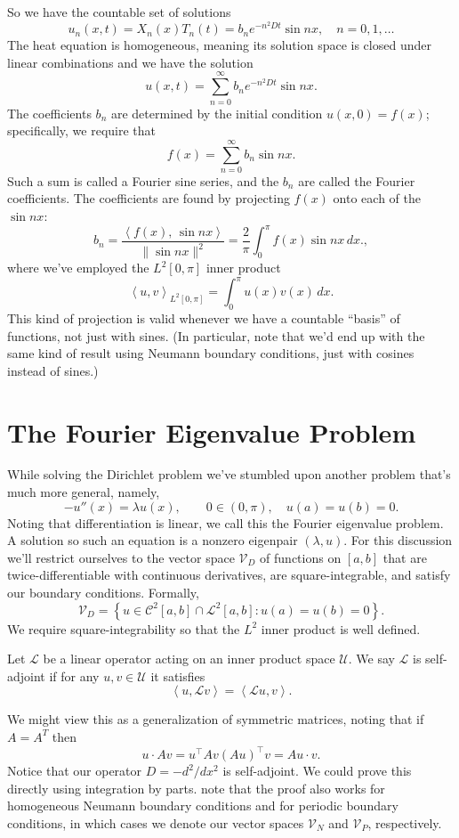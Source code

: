 \documentclass[../m180main.tex]{subfiles}
\begin{document}
So we have the countable set of solutions
\[ u_n(x,t) = X_n(x) T_n(t) = b_n e^{-n^2 Dt} \sin nx, \quad n = 0, 1, \ldots \]
The heat equation is homogeneous, meaning its solution space is closed under linear combinations and we have the solution
\[ u(x,t) = \sum_{n=0}^{\infty} b_n e^{-n^2 Dt} \sin nx. \] %
The coefficients $b_n$ are determined by the initial condition $u(x,0) = f(x)$; specifically, we require that
\[ f(x) = \sum_{n=0}^{\infty} b_n \sin nx. \]
Such a sum is called a Fourier sine series, and the $b_n$ are called the Fourier coefficients.
The coefficients are found by projecting $f(x)$ onto each of the $\sin nx$:
\[ b_n = \frac{\left< f(x), \, \sin nx \right>}{\| \sin nx \|^2} = \frac{2}{\pi} \int_{0}^{\pi} f(x) \sin nx \,dx., \]
where we've employed the $L^2[0,\pi]$ inner product
\[ \left< u, v \right>_{L^2[0,\pi]} = \int_{0}^{\pi} u(x) v(x) \,dx. \]
This kind of projection is valid whenever we have a countable ``basis'' of functions, not just with sines.
(In particular, note that we'd end up with the same kind of result using Neumann boundary conditions, just with cosines instead of sines.)

\section{The Fourier Eigenvalue Problem}
While solving the Dirichlet problem we've stumbled upon another problem that's much more general, namely,
\[ -u''(x) = \lambda u(x), \qquad 0 \in (0,\pi), \quad u(a) = u(b) = 0. \]
Noting that differentiation is linear, we call this the Fourier eigenvalue problem.
A solution so such an equation is a nonzero eigenpair $(\lambda, u)$.
For this discussion we'll restrict ourselves to the vector space $\mathcal{V}_D$ of functions on $[a,b]$ that are twice-differentiable with continuous derivatives, are square-integrable, and satisfy our boundary conditions.
Formally,
\[ \mathcal{V}_D = \left\{ u \in \mathcal{C}^2[a,b] \cap \mathcal{L}^2[a,b] : u(a) = u(b) = 0 \right\}. \]
We require square-integrability so that the $L^2$ inner product is well defined.

\begin{definition}
    Let $\mathcal L$ be a linear operator acting on an inner product space $\mathcal U$.
    We say $\mathcal L$ is self-adjoint if for any $u,v \in \mathcal U$ it satisfies
    \[ \left< u, \mathcal L v \right> = \left< \mathcal L u, v \right>. \]
\end{definition}

We might view this as a generalization of symmetric matrices, noting that if $A = A^T$ then
\[ u \cdot A v = u^\intercal Av(Au)^\intercal v = Au \cdot v. \]
Notice that our operator $D = - d^2 / dx^2$ is self-adjoint.
We could prove this directly using integration by parts.
note that the proof also works for homogeneous Neumann boundary conditions and for periodic boundary conditions, in which cases we denote our vector spaces $\mathcal V_N$ and $\mathcal V_P$, respectively.
\end{document}
